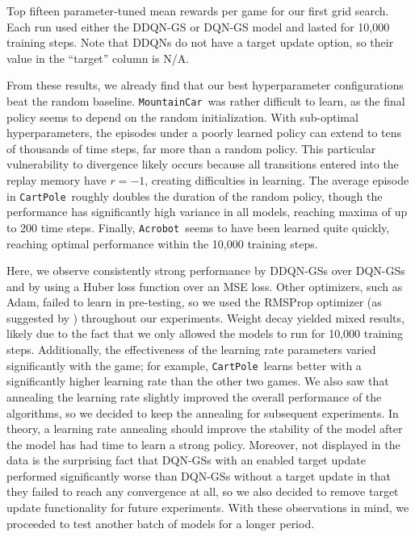 \documentclass[11pt]{article}
\newcommand{\cp}{\texttt{CartPole}}
\newcommand{\ab}{\texttt{Acrobot}}
\newcommand{\mc}{\texttt{MountainCar}}
\begin{document}
\begin{table*}[!ht]
    \footnotesize
    \centering
    
    
    \caption{Top fifteen parameter-tuned mean rewards per game for our first grid search. Each run used either the DDQN-GS or DQN-GS model and lasted for 10,000 training steps. Note that DDQNs do not have a target update option, so their value in the ``target'' column is N/A.}
    \label{tab:grid_search_v1_10k}
\end{table*}

From these results, we already find that our best hyperparameter configurations beat the random baseline. \mc~was rather difficult to learn, as the final policy seems to depend on the random initialization. With sub-optimal hyperparameters, the episodes under a poorly learned policy can extend to tens of thousands of time steps, far more than a random policy. This particular vulnerability to divergence likely occurs because all transitions entered into the replay memory have $r = -1$, creating difficulties in learning. The average episode in \cp~roughly doubles the duration of the random policy, though the performance has significantly high variance in all models, reaching maxima of up to 200 time steps. Finally, \ab~seems to have been learned quite quickly, reaching optimal performance within the 10,000 training steps.

Here, we observe consistently strong performance by DDQN-GSs over DQN-GSs and by using a Huber loss function over an MSE loss. Other optimizers, such as Adam, failed to learn in pre-testing, so we used the RMSProp optimizer (as suggested by \cite{mnih2013playing}) throughout our experiments. Weight decay yielded mixed results, likely due to the fact that we only allowed the models to run for 10,000 training steps. Additionally, the effectiveness of the learning rate parameters varied significantly with the game; for example, \cp~learns better with a significantly higher learning rate than the other two games. We also saw that annealing the learning rate slightly improved the overall performance of the algorithms, so we decided to keep the annealing for subsequent experiments. In theory, a learning rate annealing should improve the stability of the model after the model has had time to learn a strong policy. Moreover, not displayed in the data is the surprising fact that DQN-GSs with an enabled target update performed significantly worse than DQN-GSs without a target update in that they failed to reach any convergence at all, so we also decided to remove target update functionality for future experiments. With these observations in mind, we proceeded to test another batch of models for a longer period. 
\end{document}
